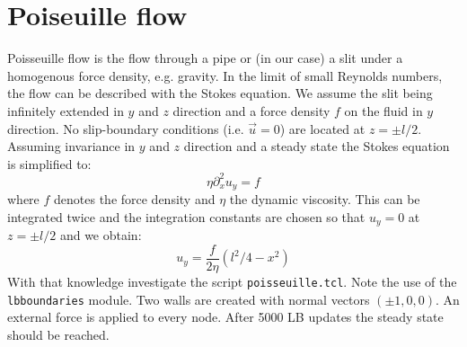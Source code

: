 \section{Poiseuille flow \ES{}}
Poisseuille flow is the flow through a pipe or (in our case) a slit
under a homogenous force density, e.g. gravity. In the limit of small Reynolds
numbers, the flow can be described with the Stokes equation. 
We assume the slit being infinitely extended in $y$ and $z$ 
direction and a force density $f$ on the fluid 
in $y$ direction. No slip-boundary conditions  (i.e. $\vec{u}=0$)
are located at $z = \pm l/2$.
Assuming invariance in $y$ and $z$ direction and a steady state 
the Stokes equation is simplified to:
\begin{equation}
  \eta \partial_x^2 u_y = f
\end{equation}
where $f$ denotes the force density and $\eta$ the dynamic viscosity.
This can be integrated twice and the integration constants are chosen
so that $u_y=0$ at $z = \pm l/2$ and we obtain:
\begin{equation}
  u_y = \frac{f}{2\eta} \left(l^2/4-x^2\right)
\end{equation}
With that knowledge investigate the script \texttt{poisseuille.tcl}.
Note the use of the \texttt{lbboundaries} module. Two walls are created
with normal vectors $\left(\pm 1, 0, 0 \right)$. An external force
is applied to every node. After 5000 LB updates the steady state should
be reached.

